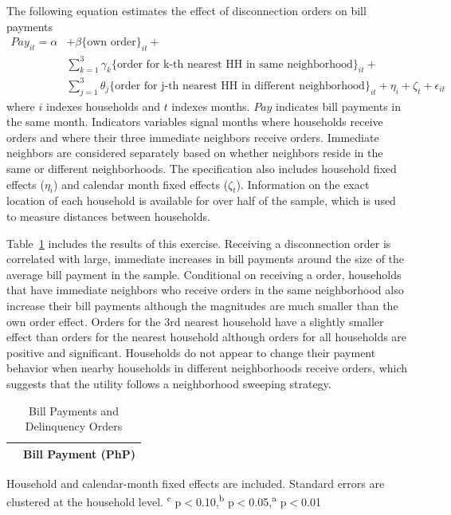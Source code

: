 \documentclass[12pt,table]{article}
\begin{document}
The following equation estimates the effect of disconnection orders on bill payments
\begin{align*}
Pay_{it} = \alpha &+ \beta  \{ \text{own order} \}_{it} + \\
 &\sum_{k=1}^{3} \gamma_k \{ \text{order for k-th nearest HH in same neighborhood} \}_{it} +  \\
 &\sum_{j=1}^{3} \theta_j \{ \text{order for j-th nearest HH in different neighborhood} \}_{it} + \eta_i + \zeta_t + \epsilon_{it}
\end{align*}
where $i$ indexes households and $t$ indexes months.  $Pay$ indicates bill payments in the same month.  Indicators variables signal months where households receive orders and where their three immediate neighbors receive orders.  Immediate neighbors are considered separately based on whether neighbors reside in the same or different neighborhoods.  The specification also includes household fixed effects ($\eta_i$) and calendar month fixed effects ($\zeta_t$).  Information on the exact location of each household is available for over half of the sample, which is used to measure distances between households.

Table~\ref{table:paywarning} includes the results of this exercise.  Receiving a disconnection order is correlated with large, immediate increases in bill payments around the size of the average bill payment in the sample.  Conditional on receiving a order, households that have immediate neighbors who receive orders in the same neighborhood also increase their bill payments although the magnitudes are much smaller than the own order effect.  Orders for the 3rd nearest household have a slightly smaller effect than orders for the nearest household although orders for all households are positive and significant.  Households do not appear to change their payment behavior when nearby households in different neighborhoods receive orders, which suggests that the utility follows a neighborhood sweeping strategy.

\begin{table}[!ht]
\small
\centering
\begin{threeparttable}
\caption{Bill Payments and Delinquency Orders}\label{table:paywarning}
\vspace{-2mm}
\begin{tabular}{lc}
\toprule
 & \small Bill Payment (PhP) \\[.5em]
 \toprule

\bottomrule
\end{tabular}
\begin{tablenotes}
\footnotesize
\item Household and calendar-month fixed effects are included. Standard errors are clustered at the household level.  \textsuperscript{c} p$<$0.10,\textsuperscript{b} p$<$0.05,\textsuperscript{a} p$<$0.01 
\end{tablenotes}
\end{threeparttable}
\end{table}
\end{document}
